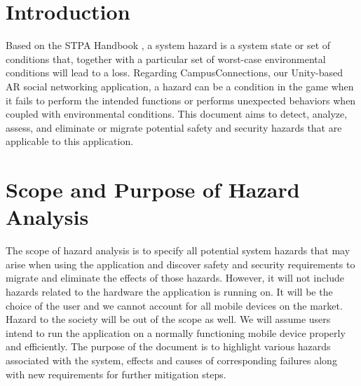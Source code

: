 \documentclass{article}
\begin{document}
\section{Introduction}

Based on the STPA Handbook \cite{STPA}, a system hazard is a system state or set of conditions that, together with a particular set of worst-case environmental conditions will lead to a loss. Regarding CampusConnections, our Unity-based AR social networking application, a hazard can be a condition in the game when it fails to perform the intended functions or performs unexpected behaviors when coupled with environmental conditions. This document aims to detect, analyze, assess, and eliminate or migrate potential safety and security hazards that are applicable to this application. 

\section{Scope and Purpose of Hazard Analysis}

The scope of hazard analysis is to specify all potential system hazards that may arise when using the application and discover safety and security requirements to migrate and eliminate the effects of those hazards. However, it will not include hazards related to the hardware the application is running on. It will be the choice of the user and we cannot account for all mobile devices on the market. Hazard to the society will be out of the scope as well. We will assume users intend to run the application on a normally functioning mobile device properly and efficiently. The purpose of the document is to highlight various hazards associated with the system, effects and causes of corresponding failures along with new requirements for further mitigation steps.
\end{document}
